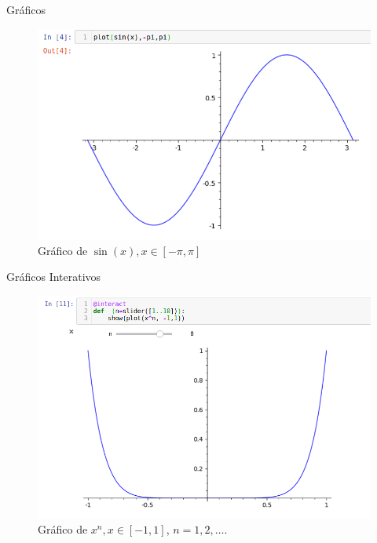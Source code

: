 \documentclass[12pt]{beamer}
\begin{document}
\begin{frame}
  {Gráficos}

  \begin{figure}[h]
    \centering
    \includegraphics[scale=0.4]{img/grafico01.png}
    \caption{Gráfico de $\sin(x), x \in [-\pi,\pi]$}
    \label{img:graficosin}
  \end{figure}

\end{frame}

\begin{frame}
  {Gráficos Interativos}
  \begin{figure}[h]
    \centering
    \includegraphics[scale=0.3]{img/grafico02.png}
    \caption{Gráfico de $x^n, x \in [-1,1]$, $n = 1,2,\dots$.}
    \label{img:graficoxn}
  \end{figure}
\end{frame}
\end{document}
